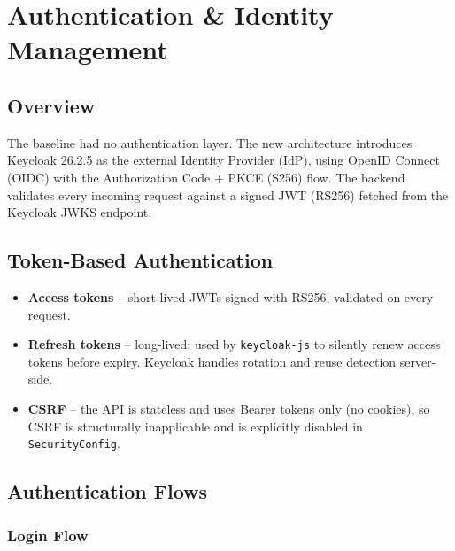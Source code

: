 \documentclass[12pt,a4paper]{report}
\begin{document}
\section{Authentication \& Identity Management}

\subsection{Overview}

The baseline had no authentication layer. The new architecture introduces Keycloak 26.2.5
as the external Identity Provider (IdP), using OpenID Connect (OIDC) with the
Authorization Code + PKCE (S256) flow. The backend validates every incoming request against
a signed JWT (RS256) fetched from the Keycloak JWKS endpoint.

\subsection{Token-Based Authentication}

\begin{itemize}
  \item \textbf{Access tokens} -- short-lived JWTs signed with RS256; validated on every request.
  \item \textbf{Refresh tokens} -- long-lived; used by \texttt{keycloak-js} to silently renew access tokens
        before expiry. Keycloak handles rotation and reuse detection server-side.
  \item \textbf{CSRF} -- the API is stateless and uses Bearer tokens only (no cookies), so CSRF
        is structurally inapplicable and is explicitly disabled in \texttt{SecurityConfig}.
\end{itemize}

\subsection{Authentication Flows}

\subsubsection{Login Flow}
\end{document}
